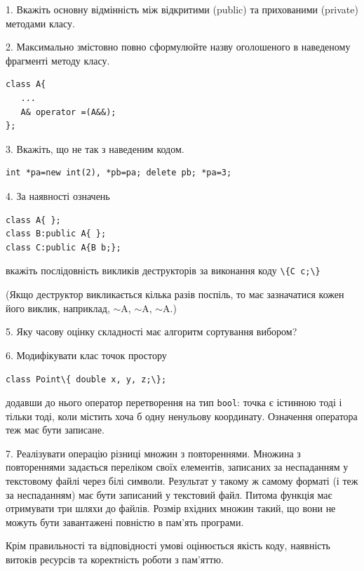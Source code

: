 \documentclass[12pt, ukrainian]{article}
\def\code#1{\Verb!#1!}
\begin{document}
{%
1. Вкажіть основну відмінність між відкритими (public) та прихованими (private) методами класу.%
\par
\vspace{2mm}
2. Максимально змістовно повно сформулюйте назву оголошеного в наведеному фрагменті методу класу.
\vspace{-3mm}
\begin{verbatim}class A{
   ...
   A& operator =(A&&);
};\end{verbatim}
\vspace{-3mm}
\par
\vspace{2mm}
3. Вкажіть, що не так з наведеним кодом.
\vspace{-3mm}
\begin{verbatim}int *pa=new int(2), *pb=pa; delete pb; *pa=3;\end{verbatim}
\vspace{-3mm}
\par
\vspace{2mm}
4. За наявності означень
\vspace{-3mm}
\begin{verbatim}
class A{ };
class B:public A{ };
class C:public A{B b;};\end{verbatim}
\vspace{-3mm}
вкажіть послідовність викликів деструкторів за виконання коду \code{\{C c;\}} 

(Якщо деструктор викликається кілька разів поспіль, то має зазначатися кожен його виклик, наприклад, $\sim$A, $\sim$A, $\sim$A.)

\vspace{2mm}
5. Яку часову оцінку складності має алгоритм сортування вибором?
\par
\vspace{2mm}
6. Модифікувати клас точок простору 

\qquad\code{class Point\{ double x, y, z;\};}


додавши до нього оператор перетворення на тип \code{bool}: точка є істинною тоді і тільки тоді, коли містить хоча б одну ненульову координату. Означення оператора теж має бути записане.%
\par
\vspace{2mm}
7. 
Реалізувати операцію різниці множин з повтореннями. Множина з повтореннями задається переліком своїх елементів, записаних за неспаданням у текстовому файлі через білі символи. Результат у такому ж самому форматі (і теж за неспаданням) має бути записаний у текстовий файл. Питома функція має отримувати три шляхи до файлів. Розмір вхідних множин такий, що вони не можуть бути завантажені повністю в пам’ять програми.

Крім правильності та відповідності умові оцінюється якість коду, наявність витоків ресурсів та коректність роботи з пам'яттю. 

}
\end{document}
